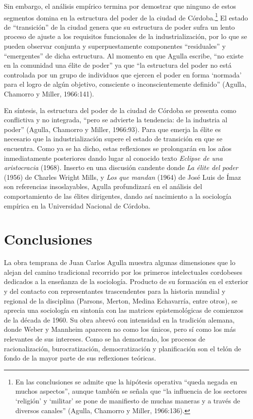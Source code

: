 Sin embargo, el análisis empírico termina por demostrar que ninguno de estos segmentos domina en la estructura del poder de la ciudad de Córdoba.\footnote{En las conclusiones se admite que la hipótesis operativa ``queda negada en muchos aspectos'', aunque también se señala que ``la influencia de los sectores `religión' y `militar' se pone de manifiesto de muchas maneras y a través de diversos canales'' (Agulla, Chamorro y Miller, 1966:136).} El estado de ``transición'' de la ciudad genera que su estructura de poder sufra un lento proceso de ajuste a los requisitos funcionales de la industrialización, por lo que se pueden observar conjunta y superpuestamente componentes ``residuales'' y ``emergentes'' de dicha estructura. Al momento en que Agulla escribe, ``no existe en la comunidad una élite de poder'' ya que ``la estructura del poder no está controlada por un grupo de individuos que ejercen el poder en forma `normada' para el logro de algún objetivo, consciente o inconscientemente definido'' (Agulla, Chamorro y Miller, 1966:141).

En síntesis, la estructura del poder de la ciudad de Córdoba se presenta como conflictiva y no integrada, ``pero se advierte la tendencia: de la industria al poder'' (Agulla, Chamorro y Miller, 1966:93). Para que emerja la élite es necesario que la industrialización supere el estado de transición en que se encuentra. Como ya se ha dicho, estas reflexiones se prolongarán en los años inmediatamente posteriores dando lugar al conocido texto \emph{Eclipse de una aristocracia} (1968). Inserto en una discusión candente donde \emph{La élite del poder} (1956) de Charles Wright Mills, y \emph{Los que mandan} (1964) de José Luis de Ímaz son referencias insoslayables, Agulla profundizará en el análisis del comportamiento de las élites dirigentes, dando así nacimiento a la sociología empírica en la Universidad Nacional de Córdoba.

\section{Conclusiones}

La obra temprana de Juan Carlos Agulla muestra algunas dimensiones que lo alejan del camino tradicional recorrido por los primeros intelectuales cordobeses dedicados a la enseñanza de la sociología. Producto de su formación en el exterior y del contacto con representantes trascendentes para la historia mundial y regional de la disciplina (Parsons, Merton, Medina Echavarría, entre otros), se aprecia una sociología en sintonía con las matrices epistemológicas de comienzos de la década de 1960. Su obra abrevó con intensidad en la tradición alemana, donde Weber y Mannheim aparecen no como los únicos, pero sí como los más relevantes de sus intereses. Como se ha demostrado, los procesos de racionalización, burocratización, democratización y planificación son el telón de fondo de la mayor parte de sus reflexiones teóricas.

